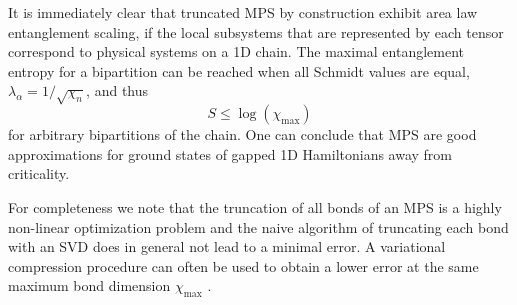 It is immediately clear that truncated MPS by construction exhibit area law entanglement scaling, if the local subsystems that are represented by each tensor correspond to physical systems on a 1D chain. The maximal entanglement entropy for a bipartition can be reached when all Schmidt values are equal, $\lambda_\alpha = 1/\sqrt{\chi_n}$, and thus
\begin{equation}
	S \le \log\left(\chi_\text{max}\right)
\end{equation}
for arbitrary bipartitions of the chain. One can conclude that MPS are good approximations for ground states of gapped 1D Hamiltonians away from criticality. \par 
For completeness we note that the truncation of all bonds of an MPS is a highly non-linear optimization problem and the naive algorithm of truncating each bond with an SVD does in general not lead to a minimal error. A variational compression procedure can often be used to obtain a lower error at the same maximum bond dimension $\chi_\text{max}$ \cite{cite:DMRG_in_the_age_of_MPS}.
\par
{}